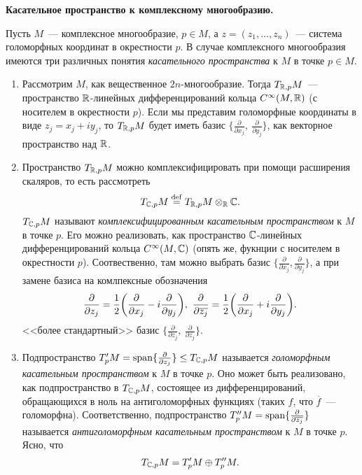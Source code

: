     \noindent\bf{Касательное пространство к комплексному многообразию.}

        Пусть $M$~--- комплексное многообразие, $p \in M$, а $z = (z_{1}, \ldots, z_n)$~--- система голоморфных координат в окрестности $p$.
        В случае комплексного многообразия имеются три различных понятия \emph{касательного пространства} к $M$ в точке $p \in M$.

        \begin{enumerate}
            \item Рассмотрим $M$, как вещественное $2n$-многообразие. Тогда $T_{\mathbb{R}, p}M$~--- пространство
            $\mathbb{R}$-линейных дифференцирований кольца $C^{\infty}(M, \mathbb{R})$ (с носителем в окрестности $p$).
            Если мы представим голоморфные координаты в виде $z_j = x_j + i y_j$, то $T_{\mathbb{R}, p}M$ будет иметь базис
            $\{ \frac{\partial }{\partial x_j}, \ \frac{\partial}{\partial y_j}\}$, как векторное пространство над $\mathbb{R}$.

            \item Пространство  $T_{\mathbb{R}, p}M$ можно комплексифицировать при помощи расширения скаляров, то есть рассмотреть
            \[ T_{\mathbb{C}, p}M \stackrel{\mathrm{def}}{=} T_{\mathbb{R}, p}M \otimes_{\mathbb{R}} \mathbb{C}. \]
            $T_{\mathbb{C}, p}M$ называют \emph{комплексифицированным касательным пространством} к $M$ в точке $p$.
            Его можно реализовать, как пространство $\mathbb{C}$-линейных дифференцирований кольца $C^{\infty}(M, \mathbb{C})$ (опять же, фукнции с носителем в окрестности $p$).
            Соотвественно, там можно выбрать базис $\{ \frac{\partial}{\partial x_j}, \frac{\partial}{\partial y_j}\}$, а при замене базиса на комлпексные обозначения
            \[ \frac{\partial}{\partial z_j} = \frac{1}{2} \lr*{\frac{\partial}{\partial x_j} - i \frac{\partial}{\partial y_j}}, \ \frac{\partial}{\partial\overline{z_j}} = \frac{1}{2}\lr*{\frac{\partial}{\partial x_j} + i \frac{\partial}{\partial y_j}}. \]
            <<более стандартный>> базис $\{ \frac{\partial}{\partial z_j}, \ \frac{\partial}{\partial \overline{z_j}}\}$.

            \item Подпространство $T'_{p}M = \operatorname{span}\{ \frac{\partial }{\partial z_j} \} \le T_{\mathbb{C}, p}M$ называется  \emph{голоморфным касательным пространством} к $M$
            в точке $p$. Оно может быть реализовано, как подпространство в $T_{\mathbb{C}, p}M$, состоящее из дифференцирований, обращающихся в ноль на антиголоморфных функциях (таких $f$, что $\overline{f}$~--- голоморфна).
            Соответственно, подпространство $T''_{p}M = \operatorname{span} \{ \frac{\partial }{\partial \overline{z_j}}\}$ называется \emph{антиголоморфным касательным пространством} к $M$ в точке $p$.
            Ясно, что
            \[ T_{\mathbb{C}, p}M = T'_{p}M \oplus T''_{p}M. \]
        \end{enumerate}

